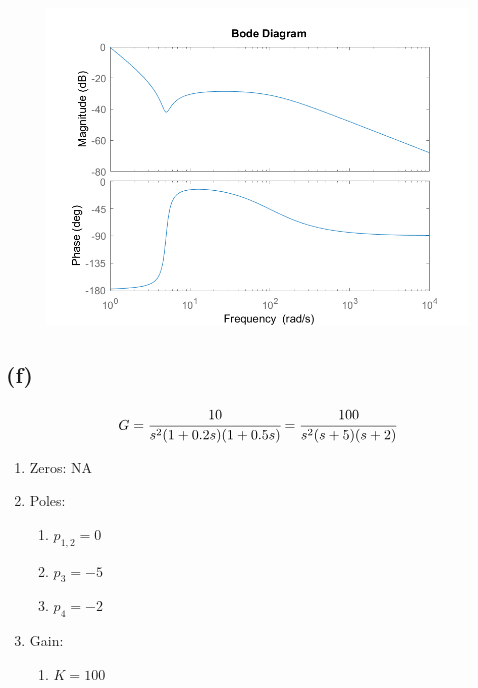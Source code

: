 \documentclass[letter]{article}
\numberwithin{equation}{section}
\begin{document}
\begin{figure}[h!]
	\centering
	\includegraphics[width=\textwidth]{figs/pblm2e.png}
\end{figure}



\newpage
\subsection{(f)}
\[
	G = \cfrac{
		10
	}{
		s^2 (1 + 0.2s) (1 + 0.5s)
	}
	= \cfrac{
		100
	}{
		s^2 (s+5)(s+2)
	}
\]
\begin{enumerate}
	\item Zeros: NA
	\item Poles:
	\begin{enumerate}
		\item $p_{1,2} = 0$
		\item $p_3 = -5$
		\item $p_4 = -2$
	\end{enumerate}
	\item Gain:
	\begin{enumerate}
		\item $K = 100$
	\end{enumerate}
\end{enumerate}
\end{document}
